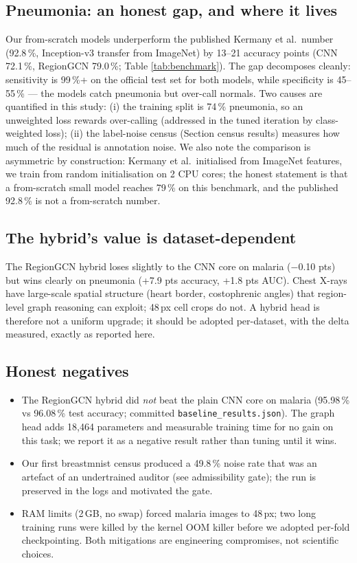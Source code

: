 \documentclass[11pt]{article}
\theoremstyle{definition}
\begin{document}
\subsection{Pneumonia: an honest gap, and where it lives}
Our from-scratch models underperform the published Kermany et al.\ number
(92.8\,\%, Inception-v3 transfer from ImageNet) by 13--21 accuracy points
(CNN 72.1\,\%, RegionGCN 79.0\,\%; Table \ref{tab:benchmark}). The gap
decomposes cleanly: sensitivity is 99\,\%+ on the official test set for
both models, while specificity is 45--55\,\% --- the models catch
pneumonia but over-call normals. Two causes are quantified in this study:
(i) the training split is 74\,\% pneumonia, so an unweighted loss rewards
over-calling (addressed in the tuned iteration by class-weighted loss);
(ii) the label-noise census (Section census results) measures how much of
the residual is annotation noise. We also note the comparison is
asymmetric by construction: Kermany et al.\ initialised from ImageNet
features, we train from random initialisation on 2 CPU cores; the honest
statement is that a from-scratch small model reaches 79\,\% on this
benchmark, and the published 92.8\,\% is not a from-scratch number.
\subsection{The hybrid's value is dataset-dependent}
The RegionGCN hybrid loses slightly to the CNN core on malaria
($-$0.10 pts) but wins clearly on pneumonia (+7.9 pts accuracy,
+1.8 pts AUC). Chest X-rays have large-scale spatial structure (heart
border, costophrenic angles) that region-level graph reasoning can
exploit; 48\,px cell crops do not. A hybrid head is therefore not a
uniform upgrade; it should be adopted per-dataset, with the delta
measured, exactly as reported here.
\subsection{Honest negatives}
\begin{itemize}
\item The RegionGCN hybrid did \emph{not} beat the plain CNN core on
malaria (95.98\,\% vs 96.08\,\% test accuracy; committed
\texttt{baseline\_results.json}). The graph head adds 18{,}464 parameters
and measurable training time for no gain on this task; we report it as a
negative result rather than tuning until it wins.
\item Our first breastmnist census produced a 49.8\,\% noise rate that was
an artefact of an undertrained auditor (see admissibility gate); the run
is preserved in the logs and motivated the gate.
\item RAM limits (2\,GB, no swap) forced malaria images to 48\,px; two
long training runs were killed by the kernel OOM killer before we adopted
per-fold checkpointing. Both mitigations are engineering compromises, not
scientific choices.
\end{itemize}
\end{document}
